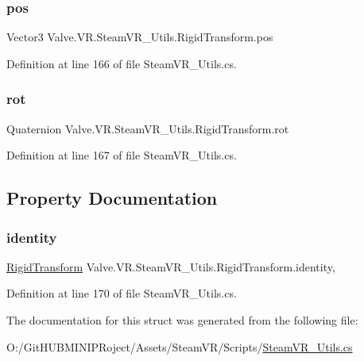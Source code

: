 \subsubsection{\texorpdfstring{pos}{pos}}
{\footnotesize\ttfamily Vector3 Valve.\+V\+R.\+Steam\+V\+R\+\_\+\+Utils.\+Rigid\+Transform.\+pos}



Definition at line 166 of file Steam\+V\+R\+\_\+\+Utils.\+cs.

\mbox{\label{struct_valve_1_1_v_r_1_1_steam_v_r___utils_1_1_rigid_transform_aa5b8421bf162f9e958f753e08e24d584}} 
\subsubsection{\texorpdfstring{rot}{rot}}
{\footnotesize\ttfamily Quaternion Valve.\+V\+R.\+Steam\+V\+R\+\_\+\+Utils.\+Rigid\+Transform.\+rot}



Definition at line 167 of file Steam\+V\+R\+\_\+\+Utils.\+cs.



\subsection{Property Documentation}
\mbox{\label{struct_valve_1_1_v_r_1_1_steam_v_r___utils_1_1_rigid_transform_a04aebe27625a29b885052af12c0dcf36}} 
\subsubsection{\texorpdfstring{identity}{identity}}
{\footnotesize\ttfamily \mbox{\hyperlink{struct_valve_1_1_v_r_1_1_steam_v_r___utils_1_1_rigid_transform}{Rigid\+Transform}} Valve.\+V\+R.\+Steam\+V\+R\+\_\+\+Utils.\+Rigid\+Transform.\+identity\hspace{0.3cm}{\ttfamily [static]}, {\ttfamily [get]}}



Definition at line 170 of file Steam\+V\+R\+\_\+\+Utils.\+cs.



The documentation for this struct was generated from the following file\+:\begin{DoxyCompactItemize}
\item 
O\+:/\+Git\+H\+U\+B\+M\+I\+N\+I\+P\+Roject/\+Assets/\+Steam\+V\+R/\+Scripts/\mbox{\hyperlink{_steam_v_r___utils_8cs}{Steam\+V\+R\+\_\+\+Utils.\+cs}}\end{DoxyCompactItemize}
